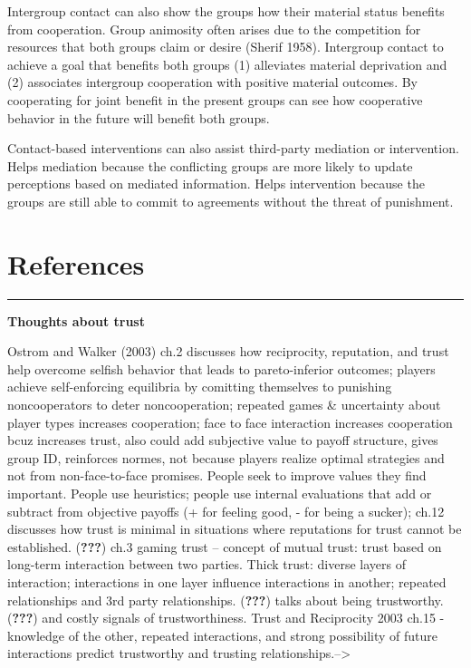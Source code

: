\documentclass[11pt]{article}
\begin{document}
Intergroup contact can also show the groups how their material status
benefits from cooperation. Group animosity often arises due to the
competition for resources that both groups claim or desire (Sherif
1958). Intergroup contact to achieve a goal that benefits both groups
(1) alleviates material deprivation and (2) associates intergroup
cooperation with positive material outcomes. By cooperating for joint
benefit in the present groups can see how cooperative behavior in the
future will benefit both groups.

Contact-based interventions can also assist third-party mediation or
intervention. Helps mediation because the conflicting groups are more
likely to update perceptions based on mediated information. Helps
intervention because the groups are still able to commit to agreements
without the threat of punishment.

\hypertarget{references}{%
\section{References}\label{references}}

\begin{center}\rule{0.5\linewidth}{\linethickness}\end{center}

\textbf{Thoughts about trust}

Ostrom and Walker (2003) ch.2 discusses how reciprocity, reputation, and
trust help overcome selfish behavior that leads to pareto-inferior
outcomes; players achieve self-enforcing equilibria by comitting
themselves to punishing noncooperators to deter noncooperation; repeated
games \& uncertainty about player types increases cooperation; face to
face interaction increases cooperation bcuz increases trust, also could
add subjective value to payoff structure, gives group ID, reinforces
normes, not because players realize optimal strategies and not from
non-face-to-face promises. People seek to improve values they find
important. People use heuristics; people use internal evaluations that
add or subtract from objective payoffs (+ for feeling good, - for being
a sucker); ch.12 discusses how trust is minimal in situations where
reputations for trust cannot be established. ({\textbf{???}}) ch.3
gaming trust -- concept of mutual trust: trust based on long-term
interaction between two parties. Thick trust: diverse layers of
interaction; interactions in one layer influence interactions in
another; repeated relationships and 3rd party relationships.
({\textbf{???}}) talks about being trustworthy. ({\textbf{???}}) and
costly signals of trustworthiness. Trust and Reciprocity 2003 ch.15 -
knowledge of the other, repeated interactions, and strong possibility of
future interactions predict trustworthy and trusting
relationships.--\textgreater{}
\end{document}
